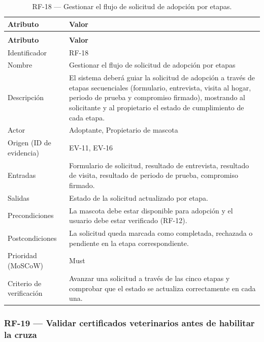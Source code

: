 \documentclass[journal,onecolumn]{IEEEtran}
\makeatletter
\newenvironment{atributos}[2]{%
	\small
	\begin{longtable}{@{}>{\raggedright\arraybackslash}p{4.2cm} >{\raggedright\arraybackslash}p{11.2cm}@{}}
		\caption{#2}\label{tab:#1}\\
		\toprule
		\textbf{Atributo} & \textbf{Valor} \\
		\midrule
		\endfirsthead
		\multicolumn{2}{@{}l}{\small\itshape (continuación)}\\
		\toprule
		\textbf{Atributo} & \textbf{Valor} \\
		\midrule
		\endhead
		\bottomrule
		\endlastfoot
	}{%
	\end{longtable}
	\normalsize
}
\makeatother
\begin{document}
	\begin{atributos}{RF-18}{RF-18 --- Gestionar el flujo de solicitud de adopción por etapas.}
		Identificador & RF-18 \\
		Nombre & Gestionar el flujo de solicitud de adopción por etapas \\
		Descripción & El sistema deberá guiar la solicitud de adopción a través de etapas secuenciales (formulario, entrevista, visita al hogar, periodo de prueba y compromiso firmado), mostrando al solicitante y al propietario el estado de cumplimiento de cada etapa. \\
		Actor & Adoptante, Propietario de mascota \\
		Origen (ID de evidencia) & EV-11, EV-16 \\
		Entradas & Formulario de solicitud, resultado de entrevista, resultado de visita, resultado de periodo de prueba, compromiso firmado. \\
		Salidas & Estado de la solicitud actualizado por etapa. \\
		Precondiciones & La mascota debe estar disponible para adopción y el usuario debe estar verificado (RF-12). \\
		Postcondiciones & La solicitud queda marcada como completada, rechazada o pendiente en la etapa correspondiente. \\
		Prioridad (MoSCoW) & Must \\
		Criterio de verificación & Avanzar una solicitud a través de las cinco etapas y comprobar que el estado se actualiza correctamente en cada una. \\
	\end{atributos}
	
	\subsubsection{RF-19 --- Validar certificados veterinarios antes de habilitar la cruza}
	
\end{document}
